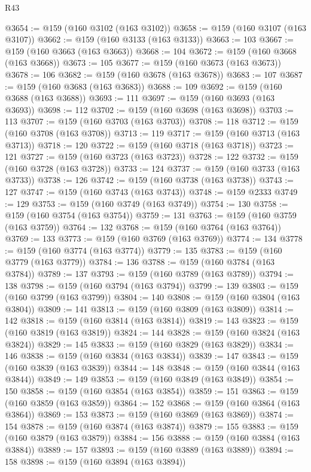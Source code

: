 \begin{lexlean}{R43}
\begin{coremodule}
@3654 := @159 (@160 @3102 (@163 @3102))
@3658 := @159 (@160 @3107 (@163 @3107))
@3662 := @159 (@160 @3133 (@163 @3133))
@3663 := 103
@3667 := @159 (@160 @3663 (@163 @3663))
@3668 := 104
@3672 := @159 (@160 @3668 (@163 @3668))
@3673 := 105
@3677 := @159 (@160 @3673 (@163 @3673))
@3678 := 106
@3682 := @159 (@160 @3678 (@163 @3678))
@3683 := 107
@3687 := @159 (@160 @3683 (@163 @3683))
@3688 := 109
@3692 := @159 (@160 @3688 (@163 @3688))
@3693 := 111
@3697 := @159 (@160 @3693 (@163 @3693))
@3698 := 112
@3702 := @159 (@160 @3698 (@163 @3698))
@3703 := 113
@3707 := @159 (@160 @3703 (@163 @3703))
@3708 := 118
@3712 := @159 (@160 @3708 (@163 @3708))
@3713 := 119
@3717 := @159 (@160 @3713 (@163 @3713))
@3718 := 120
@3722 := @159 (@160 @3718 (@163 @3718))
@3723 := 121
@3727 := @159 (@160 @3723 (@163 @3723))
@3728 := 122
@3732 := @159 (@160 @3728 (@163 @3728))
@3733 := 124
@3737 := @159 (@160 @3733 (@163 @3733))
@3738 := 126
@3742 := @159 (@160 @3738 (@163 @3738))
@3743 := 127
@3747 := @159 (@160 @3743 (@163 @3743))
@3748 := @159 @2333
@3749 := 129
@3753 := @159 (@160 @3749 (@163 @3749))
@3754 := 130
@3758 := @159 (@160 @3754 (@163 @3754))
@3759 := 131
@3763 := @159 (@160 @3759 (@163 @3759))
@3764 := 132
@3768 := @159 (@160 @3764 (@163 @3764))
@3769 := 133
@3773 := @159 (@160 @3769 (@163 @3769))
@3774 := 134
@3778 := @159 (@160 @3774 (@163 @3774))
@3779 := 135
@3783 := @159 (@160 @3779 (@163 @3779))
@3784 := 136
@3788 := @159 (@160 @3784 (@163 @3784))
@3789 := 137
@3793 := @159 (@160 @3789 (@163 @3789))
@3794 := 138
@3798 := @159 (@160 @3794 (@163 @3794))
@3799 := 139
@3803 := @159 (@160 @3799 (@163 @3799))
@3804 := 140
@3808 := @159 (@160 @3804 (@163 @3804))
@3809 := 141
@3813 := @159 (@160 @3809 (@163 @3809))
@3814 := 142
@3818 := @159 (@160 @3814 (@163 @3814))
@3819 := 143
@3823 := @159 (@160 @3819 (@163 @3819))
@3824 := 144
@3828 := @159 (@160 @3824 (@163 @3824))
@3829 := 145
@3833 := @159 (@160 @3829 (@163 @3829))
@3834 := 146
@3838 := @159 (@160 @3834 (@163 @3834))
@3839 := 147
@3843 := @159 (@160 @3839 (@163 @3839))
@3844 := 148
@3848 := @159 (@160 @3844 (@163 @3844))
@3849 := 149
@3853 := @159 (@160 @3849 (@163 @3849))
@3854 := 150
@3858 := @159 (@160 @3854 (@163 @3854))
@3859 := 151
@3863 := @159 (@160 @3859 (@163 @3859))
@3864 := 152
@3868 := @159 (@160 @3864 (@163 @3864))
@3869 := 153
@3873 := @159 (@160 @3869 (@163 @3869))
@3874 := 154
@3878 := @159 (@160 @3874 (@163 @3874))
@3879 := 155
@3883 := @159 (@160 @3879 (@163 @3879))
@3884 := 156
@3888 := @159 (@160 @3884 (@163 @3884))
@3889 := 157
@3893 := @159 (@160 @3889 (@163 @3889))
@3894 := 158
@3898 := @159 (@160 @3894 (@163 @3894))

\end{coremodule}
\end{lexlean}
